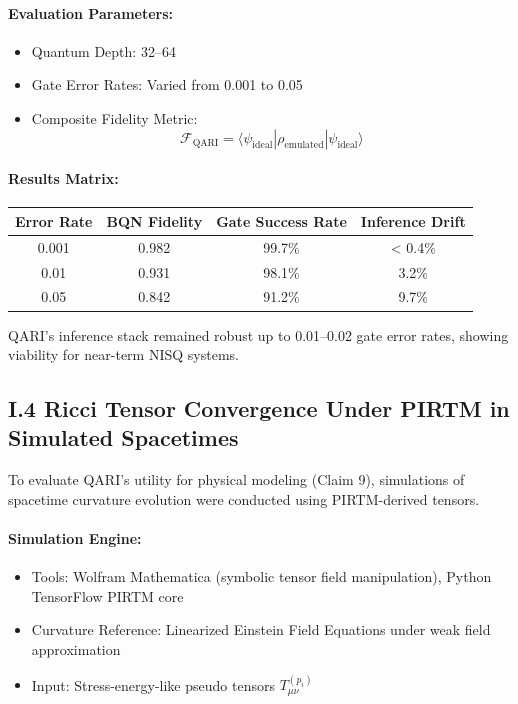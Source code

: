 \documentclass[12pt]{article}
\begin{document}
\begin{itemize}
\paragraph{Evaluation Parameters:}
\begin{itemize}
    \item Quantum Depth: 32–64
    \item Gate Error Rates: Varied from 0.001 to 0.05
    \item Composite Fidelity Metric:
    \[
    \mathcal{F}_{\text{QARI}} = \langle \psi_{\text{ideal}} | \rho_{\text{emulated}} | \psi_{\text{ideal}} \rangle
    \]
\end{itemize}

\paragraph{Results Matrix:}

\begin{tabular}{|c|c|c|c|}
\hline
\textbf{Error Rate} & \textbf{BQN Fidelity} & \textbf{Gate Success Rate} & \textbf{Inference Drift} \\
\hline
0.001 & 0.982 & 99.7\% & < 0.4\% \\
\hline
0.01 & 0.931 & 98.1\% & 3.2\% \\
\hline
0.05 & 0.842 & 91.2\% & 9.7\% \\
\hline
\end{tabular}

QARI’s inference stack remained robust up to 0.01–0.02 gate error rates, showing viability for near-term NISQ systems.

\subsection*{I.4 Ricci Tensor Convergence Under PIRTM in Simulated Spacetimes}

To evaluate QARI's utility for physical modeling (Claim 9), simulations of spacetime curvature evolution were conducted using PIRTM-derived tensors.

\paragraph{Simulation Engine:}
\begin{itemize}
    \item Tools: Wolfram Mathematica (symbolic tensor field manipulation), Python TensorFlow PIRTM core
    \item Curvature Reference: Linearized Einstein Field Equations under weak field approximation
    \item Input: Stress-energy-like pseudo tensors \( T^{(p_i)}_{\mu\nu} \)
\end{itemize}


\end{itemize}
\end{document}
